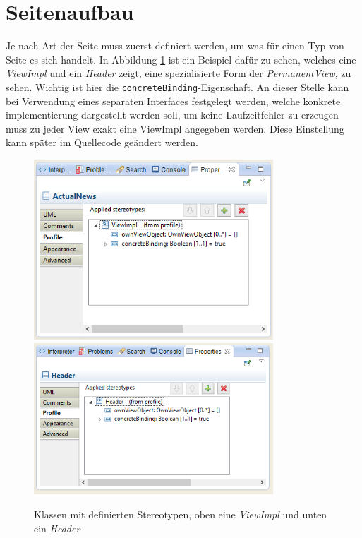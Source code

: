 \section{Seitenaufbau}
Je nach Art der Seite muss zuerst definiert werden, um was für einen Typ von
Seite es sich handelt. In Abbildung \ref{Fig:SideProp} ist ein Beispiel dafür
zu sehen, welches eine \textit{ViewImpl} und ein \textit{Header} zeigt, eine
spezialisierte Form der \textit{PermanentView}, zu sehen. Wichtig ist hier
die \texttt{concreteBinding}-Eigenschaft. An dieser Stelle kann bei Verwendung
eines separaten Interfaces festgelegt werden, welche konkrete implementierung
dargestellt werden soll, um keine Laufzeitfehler zu erzeugen muss zu jeder View
exakt eine ViewImpl angegeben werden. Diese Einstellung kann später im
Quellecode geändert werden.

\newpage
\begin{figure}[htbp]
\begin{center}
\includegraphics[width=0.8\textwidth]{./img/Prop-ViewImp.png}
\includegraphics[width=0.8\textwidth]{./img/Prop-Header.png}
\caption{Klassen mit definierten Stereotypen, oben
eine \textit{ViewImpl} und unten ein \textit{Header}}\label{Fig:SideProp}
\end{center}
\end{figure} 

